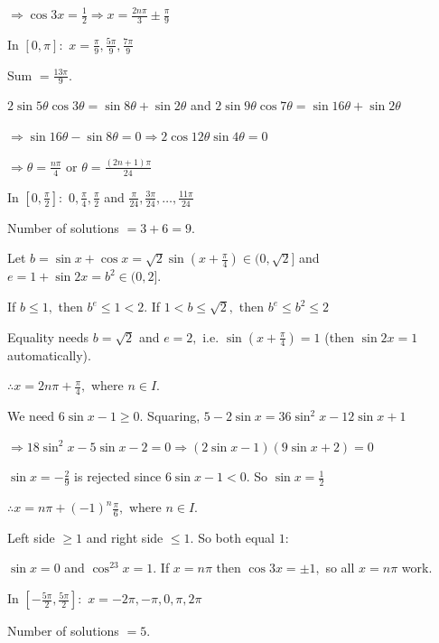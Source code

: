   $\Rightarrow \cos3x = \frac{1}{2} \Rightarrow x = \frac{2n\pi}{3}\pm\frac{\pi}{9}$

  In $[0, \pi]:$ $x = \frac{\pi}{9}, \frac{5\pi}{9}, \frac{7\pi}{9}$

  Sum $= \frac{13\pi}{9}.$

\item $2\sin5\theta\cos3\theta = \sin8\theta + \sin2\theta$ and $2\sin9\theta\cos7\theta = \sin16\theta + \sin2\theta$

  $\Rightarrow \sin16\theta - \sin8\theta = 0 \Rightarrow 2\cos12\theta\sin4\theta = 0$

  $\Rightarrow \theta = \frac{n\pi}{4}$ or $\theta = \frac{(2n + 1)\pi}{24}$

  In $\left[0, \frac{\pi}{2}\right]:$ $0, \frac{\pi}{4}, \frac{\pi}{2}$ and $\frac{\pi}{24}, \frac{3\pi}{24}, \ldots,
  \frac{11\pi}{24}$

  Number of solutions $= 3 + 6 = 9.$

\item Let $b = \sin x + \cos x = \sqrt{2}\sin\left(x + \frac{\pi}{4}\right)\in(0, \sqrt{2}]$ and $e = 1 + \sin2x = b^2\in(0,
  2].$

  If $b\leq 1,$ then $b^e\leq 1 < 2.$ If $1 < b\leq\sqrt{2},$ then $b^e\leq b^2\leq 2$

  Equality needs $b = \sqrt{2}$ and $e = 2,$ i.e. $\sin\left(x + \frac{\pi}{4}\right) = 1$ (then $\sin2x = 1$ automatically).

  $\therefore x = 2n\pi + \frac{\pi}{4},$ where $n\in I.$

\item We need $6\sin x - 1\geq 0.$ Squaring, $5 - 2\sin x = 36\sin^2x - 12\sin x + 1$

  $\Rightarrow 18\sin^2x - 5\sin x - 2 = 0 \Rightarrow (2\sin x - 1)(9\sin x + 2) = 0$

  $\sin x = -\frac{2}{9}$ is rejected since $6\sin x - 1 < 0.$ So $\sin x = \frac{1}{2}$

  $\therefore x = n\pi + (-1)^n\frac{\pi}{6},$ where $n\in I.$

\item Left side $\geq 1$ and right side $\leq 1.$ So both equal $1:$

  $\sin x = 0$ and $\cos^23x = 1.$ If $x = n\pi$ then $\cos3x = \pm 1,$ so all $x = n\pi$ work.

  In $\left[-\frac{5\pi}{2}, \frac{5\pi}{2}\right]:$ $x = -2\pi, -\pi, 0, \pi, 2\pi$

  Number of solutions $= 5.$

